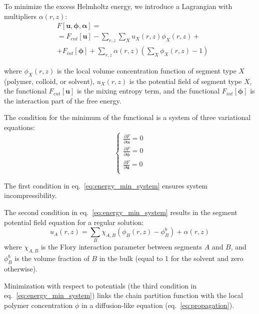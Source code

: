 \documentclass[10pt, a4paper]{article}
\begin{document}
\begin{multicols}{2}
To minimize the excess Helmholtz energy, we introduce a Lagrangian with multipliers $\alpha(r, z)$:
\begin{equation}
    \label{eq:fe_lagrangian}
    \begin{aligned}
        &F[\mathbf{u}, \boldsymbol{\phi}, \boldsymbol{\alpha}] =\\
        &= F_{ent}[\mathbf{u}] - \sum\limits_{r,z} \sum\limits_X u_X(r, z) \phi_X(r, z) + \\
        &+ F_{int} [\boldsymbol{\phi}] 
        + \sum\limits_{r,z} \alpha(r, z) \left( \sum\limits_X \phi_X(r, z) - 1 \right)
    \end{aligned} 
\end{equation}

where $\phi_X(r, z)$ is the local volume concentration function of segment type $X$ (polymer, colloid, or solvent), $u_X(r, z)$ is the potential field of segment type $X$, the functional $F_{ent}[\mathbf{u}]$ is the mixing entropy term, and the functional $F_{int} [\boldsymbol{\phi}]$ is the interaction part of the free energy.

The condition for the minimum of the functional is a system of three variational equations:
\begin{equation}
    \label{eq:energy_min_system}
    \begin{cases}
        \frac{\partial F}{\partial \boldsymbol{\alpha}} = 0 \\
        \frac{\partial F}{\partial \boldsymbol{\phi}} = 0 \\
        \frac{\partial F}{\partial \mathbf{u}} = 0 \\
    \end{cases}
\end{equation}

The first condition in eq.~\ref{eq:energy_min_system} ensures system incompressibility.

The second condition in eq.~\ref{eq:energy_min_system} results in the segment potential field equation for a regular solution:
\begin{equation}
    \label{eq:u-phi}
    u_A(r, z) =\sum\limits_{B} \chi_{A,B} \left(\phi_B(r,z) - \phi_B^b \right) + \alpha(r, z)
\end{equation}
where $\chi_{A,B}$ is the Flory interaction parameter between segments $A$ and $B$, and $\phi_B^b$ is the volume fraction of $B$ in the bulk (equal to 1 for the solvent and zero otherwise).

Minimization with respect to potentials (the third condition in eq.~\ref{eq:energy_min_system}) links the chain partition function with the local polymer concentration $\phi$ in a diffusion-like equation (eq.~\ref{eq:propagation}).


\end{multicols}
\end{document}
